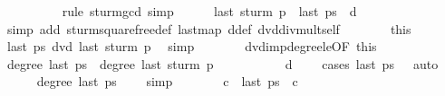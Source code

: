 \begin{isabellebody}
\ \ \ \ \ \ \ \ \isamarkupfalse%
\ {\isacharparenleft}rule\ sturm{\isacharunderscore}gcd{\isacharcomma}\ simp{\isacharparenright}\isanewline
\ \ \ \ \isamarkupfalse%
\ {\isachardoublequoteopen}last\ {\isacharparenleft}sturm\ p{\isacharparenright}\ {\isacharequal}\ last\ {\isacharquery}ps{\isacharprime}\ {\isacharasterisk}\ d{\isachardoublequoteclose}\isanewline
\ \ \ \ \ \ \ \ \isamarkupfalse%
\ {\isacharparenleft}simp\ add{\isacharcolon}\ sturm{\isacharunderscore}squarefree{\isacharprime}{\isacharunderscore}def\ last{\isacharunderscore}map\ d{\isacharunderscore}def\ dvd{\isacharunderscore}div{\isacharunderscore}mult{\isacharunderscore}self{\isacharparenright}\isanewline
\ \ \ \ \isamarkupfalse%
\ \isamarkupfalse%
\ this\ \isamarkupfalse%
\ {\isachardoublequoteopen}last\ {\isacharquery}ps{\isacharprime}\ dvd\ last\ {\isacharparenleft}sturm\ p{\isacharparenright}{\isachardoublequoteclose}\ \isamarkupfalse%
\ simp\isanewline
\ \ \ \ \isamarkupfalse%
\ \isamarkupfalse%
\ dvd{\isacharunderscore}imp{\isacharunderscore}degree{\isacharunderscore}le{\isacharbrackleft}OF\ this{\isacharbrackright}\isanewline
\ \ \ \ \isamarkupfalse%
\ \isamarkupfalse%
\ {\isachardoublequoteopen}degree\ {\isacharparenleft}last\ {\isacharquery}ps{\isacharprime}{\isacharparenright}\ {\isasymle}\ degree\ {\isacharparenleft}last\ {\isacharparenleft}sturm\ p{\isacharparenright}{\isacharparenright}{\isachardoublequoteclose}\ \isanewline
\ \ \ \ \ \ \ \ \isamarkupfalse%
\ {\isacharbackquoteopen}d\ {\isasymnoteq}\ {}{\isacharbackquoteclose}\ \isamarkupfalse%
\ {\isacharparenleft}cases\ {\isachardoublequoteopen}last\ {\isacharquery}ps{\isacharprime}\ {\isacharequal}\ {}{\isachardoublequoteclose}{\isacharcomma}\ auto{\isacharparenright}\isanewline
\ \ \ \ \isamarkupfalse%
\ {\isachardoublequoteopen}degree\ {\isacharparenleft}last\ {\isacharquery}ps{\isacharprime}{\isacharparenright}\ {\isacharequal}\ {}{\isachardoublequoteclose}\ \isamarkupfalse%
\ simp\isanewline
\ \ \ \ \isamarkupfalse%
\ \isamarkupfalse%
\ c\ \ {\isachardoublequoteopen}last\ {\isacharquery}ps{\isacharprime}\ {\isacharequal}\ {\isacharbrackleft}{\isacharcolon}c{\isacharcolon}{\isacharbrackright}{\isachardoublequoteclose}\ \isanewline
\ \ \ \ \ \ \ \ \isamarkupfalse%

\end{isabellebody}
